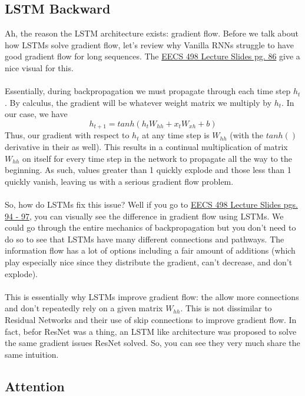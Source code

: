 \documentclass[12pt]{article}
\begin{document}
\subsection{LSTM Backward}
Ah, the reason the LSTM architecture exists: gradient flow. Before we talk about how LSTMs 
solve gradient flow, let's review why Vanilla RNNs struggle to have good gradient flow for 
long sequences. The \href{https://web.eecs.umich.edu/~justincj/slides/eecs498/498_FA2019_lecture12.pdf}
{EECS 498 Lecture Slides pg. 86} give a nice visual for this. 
~\\
~\\
Essentially, during backpropagation we must propagate through each time step $h_t$. By calculus, 
the gradient will be whatever weight matrix we multiply by $h_t$. In our case, we have 
\begin{equation*}
    h_{t+1} = tanh(h_{t}W_{hh} + x_tW_{xh} + b)
\end{equation*}
Thus, our gradient with respect to $h_t$ at any time step is $W_{hh}$ (with the 
$tanh()$ derivative in their as well). This results in a continual multiplication 
of matrix $W_{hh}$ on itself for every time step in the network to propagate all 
the way to the beginning. As such, values greater than 1 quickly explode and those 
less than 1 quickly vanish, leaving us with a serious gradient flow problem. 
~\\
~\\
So, how do LSTMs fix this issue? Well if you go to \href{https://web.eecs.umich.edu/~justincj/slides/eecs498/498_FA2019_lecture12.pdf}
{EECS 498 Lecture Slides pgs. 94 - 97}, you can visually see the difference in gradient 
flow using LSTMs. We could go through the entire mechanics of backpropagation but you don't 
need to do so to see that LSTMs have many different connections and pathways. The information 
flow has a lot of options including a fair amount of additions (which play especially nice since
they distribute the gradient, can't decrease, and don't explode). 
~\\
~\\
This is essentially why LSTMs improve gradient flow: the allow more connections and don't 
repeatedly rely on a given matrix $W_{hh}$. This is not dissimilar to Residual Networks and 
their use of skip connections to improve gradient flow. In fact, befor ResNet was a thing, 
an LSTM like architecture was proposed to solve the same gradient issues ResNet solved. So, 
you can see they very much share the same intuition. 

\subsection{Attention}
\end{document}
